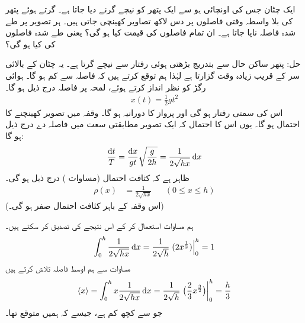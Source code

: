 ایک چٹان جس کی اونچائی  ہو سے ایک پتھر کو نیچے گرنے دیا جاتا ہے۔ گرتے ہوئے  پتھر کی بلا واسطہ وقتی فاصلوں پر دس لاکھ تصاویر کھینچی  جاتی  ہیں۔ ہر تصویر پر طے شدہ فاصلہ ناپا جاتا ہے۔ ان تمام فاصلوں کی قیمت کیا ہو گی؟ یعنی طے شدہ فاصلوں کی  کیا ہو گی؟ 

حل: \quad
پتھر ساکن حال سے بتدریج بڑھتی ہوئی رفتار سے نیچے گرتا ہے۔ یہ چٹان کے  بالائی سر کے قریب زیادہ وقت گزارتا ہے لہٰذا  ہم توقع کرتے ہیں کہ
 فاصلہ  سے کم ہو گا۔ ہوائی رگڑ کو نظر انداز کرتے ہوئے،  لمحہ  پر فاصلہ  درج ذیل ہو گا۔
\begin{align*}
 x(t) = \frac{1}{2} gt^2 
\end{align*}
اس کی سمتی رفتار   ہو گی اور پرواز کا  دورانیہ  ہو گا۔ وقفہ   میں تصویر کھینچنے کا احتمال  ہو گا۔ یوں اس کا احتمال کہ ایک تصویر  مطابقتی سعت  میں فاصلہ دے درج ذیل ہو گا:
 \begin{align*}
 \frac{\dif t}{T} = \frac{\dif x}{gt}\sqrt{\frac{g}{2h}} = \frac{1}{2\sqrt{hx}}\dif x
\end{align*}   
 ظاہر ہے کہ کثافت احتمال  (مساوات ) درج ذیل ہو گی۔
 \begin{align*}
 \rho(x)&=\frac{1}{2\sqrt{hx}} && (0\leq x\leq h)
 \end{align*}
 (اس وقفہ کے باہر کثافت  احتمال صفر ہو گی۔) 

ہم مساوات  استعمال کر کے اس نتیجے  کی تصدیق کر سکتے ہیں۔
 \begin{align*}
 \int_0^h \frac{1}{2\sqrt{hx}}\dif x = \frac{1}{2\sqrt{h}}\left .(2x^{\frac{1}{2}})\right\vert_0^h =1
 \end{align*}
 مساوات  سے ہم  اوسط فاصلہ تلاش  کرتے ہیں
 \begin{align*}
 \langle x\rangle =\int_0^h x\frac{1}{2\sqrt{hx}}\dif x= \frac{1}{2\sqrt{h}} \left . \big(\frac{2}{3}x^{\frac{3}{2}}\big)\right\vert_0^h = \frac{h}{3}
 \end{align*}
 جو     سے کچھ کم ہے،   جیسے  کہ ہمیں متوقع    تھا۔

